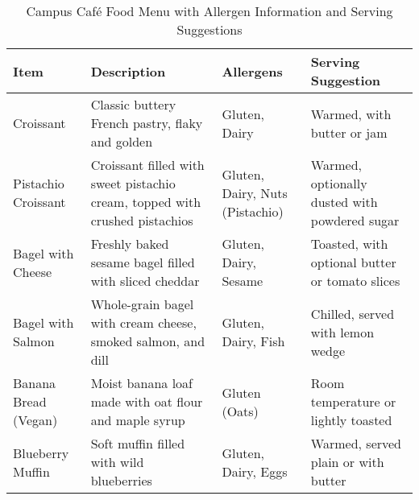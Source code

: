 \begin{table}[h!]
\centering
\renewcommand{\arraystretch}{1.2}
\begin{tabular}{|p{3cm}|p{4cm}|p{3cm}|p{3cm}|}
\hline
\textbf{Item} & \textbf{Description} & \textbf{Allergens} & \textbf{Serving Suggestion} \\
\hline
Croissant & Classic buttery French pastry, flaky and golden & Gluten, Dairy & Warmed, with butter or jam \\
\hline
Pistachio Croissant & Croissant filled with sweet pistachio cream, topped with crushed pistachios & Gluten, Dairy, Nuts (Pistachio) & Warmed, optionally dusted with powdered sugar \\
\hline
Bagel with Cheese & Freshly baked sesame bagel filled with sliced cheddar & Gluten, Dairy, Sesame & Toasted, with optional butter or tomato slices \\
\hline
Bagel with Salmon & Whole-grain bagel with cream cheese, smoked salmon, and dill & Gluten, Dairy, Fish & Chilled, served with lemon wedge \\
\hline
Banana Bread (Vegan) & Moist banana loaf made with oat flour and maple syrup & Gluten (Oats) & Room temperature or lightly toasted \\
\hline
Blueberry Muffin & Soft muffin filled with wild blueberries & Gluten, Dairy, Eggs & Warmed, served plain or with butter \\
\hline
\end{tabular}
\caption{Campus Café Food Menu with Allergen Information and Serving Suggestions}
\end{table}